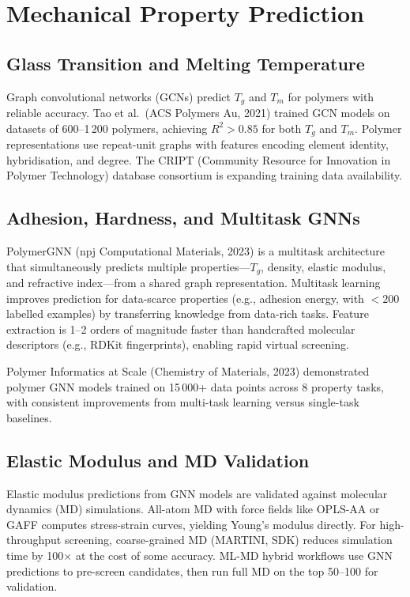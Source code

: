\documentclass[11pt,a4paper]{article}
\begin{document}
\section{Mechanical Property Prediction}
\label{sec:mechpred}

\subsection{Glass Transition and Melting Temperature}

Graph convolutional networks (GCNs) predict $T_g$ and $T_m$ for polymers with reliable accuracy.
Tao et al.\ (ACS Polymers Au, 2021) trained GCN models on datasets of 600--1\,200 polymers, achieving $R^2 > 0.85$ for both $T_g$ and $T_m$.
Polymer representations use repeat-unit graphs with features encoding element identity, hybridisation, and degree.
The CRIPT (Community Resource for Innovation in Polymer Technology) database consortium is expanding training data availability.

\subsection{Adhesion, Hardness, and Multitask GNNs}

PolymerGNN (npj Computational Materials, 2023) is a multitask architecture that simultaneously predicts multiple properties---$T_g$, density, elastic modulus, and refractive index---from a shared graph representation.
Multitask learning improves prediction for data-scarce properties (e.g., adhesion energy, with $< 200$ labelled examples) by transferring knowledge from data-rich tasks.
Feature extraction is 1--2 orders of magnitude faster than handcrafted molecular descriptors (e.g., RDKit fingerprints), enabling rapid virtual screening.

Polymer Informatics at Scale (Chemistry of Materials, 2023) demonstrated polymer GNN models trained on 15\,000+ data points across 8 property tasks, with consistent improvements from multi-task learning versus single-task baselines.

\subsection{Elastic Modulus and MD Validation}

Elastic modulus predictions from GNN models are validated against molecular dynamics (MD) simulations.
All-atom MD with force fields like OPLS-AA or GAFF computes stress-strain curves, yielding Young's modulus directly.
For high-throughput screening, coarse-grained MD (MARTINI, SDK) reduces simulation time by 100$\times$ at the cost of some accuracy.
ML-MD hybrid workflows use GNN predictions to pre-screen candidates, then run full MD on the top 50--100 for validation.
\end{document}
